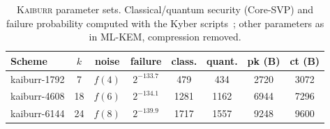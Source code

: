 \documentclass[journal=tches,preprint,floatrow]{iacrtrans}
\begin{document}
\begin{table}[H]
  \centering
  \footnotesize
  \setlength{\tabcolsep}{4pt}
  \caption{\textsc{Kaiburr} parameter sets. Classical/quantum security (Core-SVP) and failure probability computed with the Kyber scripts~\cite{kyber-estimates}; other parameters as in ML-KEM, compression removed.\protect\footnotemark}
\label{tab:kaiburr-params}
  \begin{tabular}{@{}lcc c
      S[table-format=3.0] S[table-format=3.0]
      S[table-format=4.0] S[table-format=4.0]@{}}
    \toprule
    Scheme & $k$ & noise & failure & {class.} & {quant.} & {pk (B)} & {ct (B)} \\
    \midrule
    kaiburr-1792 & 7  & $f(4)$ & $2^{-133.7}$ & {479} & {434} & 2720 & 3072 \\
    kaiburr-4608 & 18 & $f(6)$ & $2^{-134.1}$ & {1281} & {1162} & 6944 & 7296 \\
    kaiburr-6144 & 24 & $f(8)$ & $2^{-139.9}$ & {1717} & {1557} & 9248 & 9600 \\
    \bottomrule
  \end{tabular}
\end{table}

\end{document}
